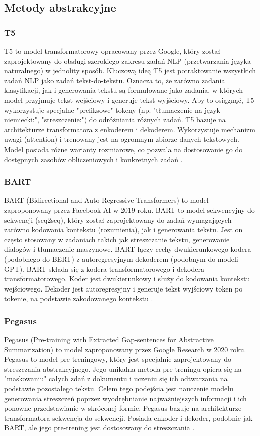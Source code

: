\documentclass{article}
\begin{document}
\subsection{Metody abstrakcyjne}

\subsubsection{T5}
T5 to model transformatorowy opracowany przez Google, który został zaprojektowany do obsługi szerokiego zakresu zadań NLP (przetwarzania języka naturalnego) w jednolity sposób.
Kluczową ideą T5 jest potraktowanie wszystkich zadań NLP jako zadań tekst-do-tekstu. Oznacza to, że zarówno zadania klasyfikacji, jak i generowania tekstu są formułowane jako zadania, w których model przyjmuje tekst wejściowy i generuje tekst wyjściowy.
Aby to osiągnąć, T5 wykorzystuje specjalne "prefiksowe" tokeny (np. "tłumaczenie na język niemiecki:", "streszczenie:") do odróżniania różnych zadań.
T5 bazuje na architekturze transformatora z enkoderem i dekoderem.
Wykorzystuje mechanizm uwagi (attention) i trenowany jest na ogromnym zbiorze danych tekstowych.
Model posiada różne warianty rozmiarowe, co pozwala na dostosowanie go do dostępnych zasobów obliczeniowych i konkretnych zadań \cite{DBLP:journals/corr/abs-1910-10683}.

\subsubsection{BART}
BART (Bidirectional and Auto-Regressive Transformers) to model zaproponowany przez Facebook AI w 2019 roku.
BART to model sekwencyjny do sekwencji (seq2seq), który został zaprojektowany do zadań wymagających zarówno kodowania kontekstu (rozumienia), jak i generowania tekstu.
Jest on często stosowany w zadaniach takich jak streszczanie tekstu, generowanie dialogów i tłumaczenie maszynowe. 
BART łączy cechy dwukierunkowego kodera (podobnego do BERT) z autoregresyjnym dekoderem (podobnym do modeli GPT).
BART składa się z kodera transformatorowego i dekodera transformatorowego. 
Koder jest dwukierunkowy i służy do kodowania kontekstu wejściowego. 
Dekoder jest autoregresyjny i generuje tekst wyjściowy token po tokenie, na podstawie zakodowanego kontekstu \cite{DBLP:journals/corr/abs-1910-13461}.

\subsubsection{Pegasus}
Pegasus (Pre-training with Extracted Gap-sentences for Abstractive Summarization) to model zaproponowany przez Google Research w 2020 roku. 
Pegasus to model pre-treningowy, który jest specjalnie zaprojektowany do streszczania abstrakcyjnego. 
Jego unikalna metoda pre-treningu opiera się na "maskowaniu" całych zdań z dokumentu i uczeniu się ich odtwarzania na podstawie pozostałego tekstu. 
Celem tego podejścia jest nauczenie modelu generowania streszczeń poprzez wyodrębnianie najważniejszych informacji i ich ponowne przedstawianie w skróconej formie.
Pegasus bazuje na architekturze transformatora sekwencja-do-sekwencji. Posiada enkoder i dekoder, podobnie jak BART, ale jego pre-trening jest dostosowany do streszczania \cite{DBLP:journals/corr/abs-1912-08777}.
\end{document}
